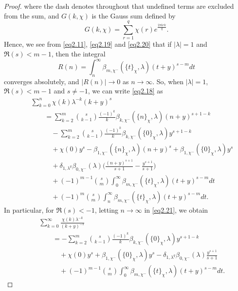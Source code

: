 \documentclass[10pt,a4paper]{amsart}
\begin{document}
\begin{proof}
where the dash denotes throughout that undefined terms are excluded from the sum, and $G(k,\chi)$ is the Gauss sum defined by
\begin{equation*}
G(k,\chi)=\sum_{r=1}^{q}\chi(r)e^{\frac{2\pi \mathrm{i}rk}{q}}.
\end{equation*}
Hence, we see from \eqref{eq2.11}, \eqref{eq2.19} and \eqref{eq2.20} that if $|\lambda|=1$ and $\Re(s)<m-1$, then the integral
\begin{equation*}
R(n)=\int_{n}^{\infty}\beta_{m,\chi^{-}}(\{t\}_{\chi},\lambda)(t+y)^{s-m}dt
\end{equation*}
converges absolutely, and $|R(n)|\rightarrow0$ as $n\rightarrow\infty$. So, when $|\lambda|=1$, $\Re(s)<m-1$ and $s\neq-1$, we can write \eqref{eq2.18} as
\begin{eqnarray}\label{eq2.21}
&&\sum_{k=0}^{n}\chi(k)\lambda^{-k}(k+y)^{s}\nonumber\\
&&\qquad=\sum_{k=2}^{m}\binom{s}{k-1}\frac{(-1)^{k}}{k}\beta_{k,\chi^{-}}(\{n\}_{\chi},\lambda)(n+y)^{s+1-k}\nonumber\\
&&\qquad\quad-\sum_{k=2}^{m}\binom{s}{k-1}\frac{(-1)^{k}}{k}\beta_{k,\chi^{-}}(\{0\}_{\chi},\lambda)y^{s+1-k}\nonumber\\
&&\qquad\quad+\chi(0)y^{s}-\beta_{1,\chi^{-}}(\{n\}_{\chi},\lambda)(n+y)^{s}+\beta_{1,\chi^{-}}(\{0\}_{\chi},\lambda)y^{s}\nonumber\\
&&\qquad\quad+\delta_{1,\lambda^{q}}\beta_{0,\chi^{-}}(\lambda)\biggl(\frac{(n+y)^{s+1}}{s+1}-\frac{y^{s+1}}{s+1}\biggl)\nonumber\\
&&\qquad\quad+(-1)^{m-1}\binom{s}{m}\int_{0}^{\infty}\beta_{m,\chi^{-}}(\{t\}_{\chi},\lambda)(t+y)^{s-m}dt\nonumber\\
&&\qquad\quad+(-1)^{m}\binom{s}{m}\int_{n}^{\infty}\beta_{m,\chi^{-}}(\{t\}_{\chi},\lambda)(t+y)^{s-m}dt.
\end{eqnarray}
In particular, for $\Re(s)<-1$, letting $n\rightarrow\infty$ in \eqref{eq2.21}, we obtain
\begin{eqnarray}\label{eq2.22}
&&\sum_{k=0}^{\infty}\frac{\chi(k)\lambda^{-k}}{(k+y)^{-s}}\nonumber\\
&&\qquad=-\sum_{k=2}^{m}\binom{s}{k-1}\frac{(-1)^{k}}{k}\beta_{k,\chi^{-}}(\{0\}_{\chi},\lambda)y^{s+1-k}\nonumber\\
&&\qquad\quad+\chi(0)y^{s}+\beta_{1,\chi^{-}}(\{0\}_{\chi},\lambda)y^{s}-\delta_{1,\lambda^{q}}\beta_{0,\chi^{-}}(\lambda)\frac{y^{s+1}}{s+1}\nonumber\\
&&\qquad\quad+(-1)^{m-1}\binom{s}{m}\int_{0}^{\infty}\beta_{m,\chi^{-}}(\{t\}_{\chi},\lambda)(t+y)^{s-m}dt.

\end{eqnarray}
\end{proof}
\end{document}
